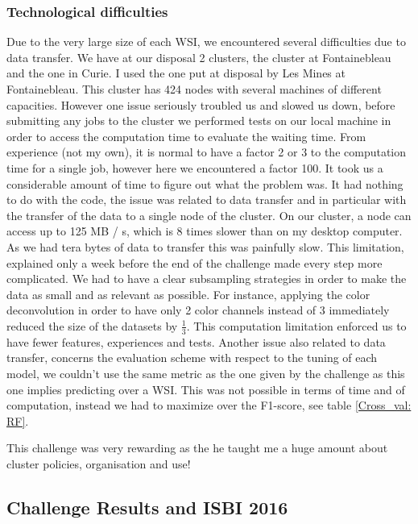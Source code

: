 \documentclass[a4paper,10pt]{article}
\begin{document}
\subsubsection*{Technological difficulties}

Due to the very large size of each WSI, we encountered several difficulties due to data transfer. We have at our disposal 2 clusters, the cluster at Fontainebleau and the one in Curie. I used the one put at disposal by Les Mines at Fontainebleau. This cluster has 424 nodes with several machines of different capacities. However one issue seriously troubled us and slowed us down, before submitting any jobs to the cluster we performed tests on our local machine in order to access the computation time to evaluate the waiting time. From experience (not my own), it is normal to have a factor 2 or 3 to the computation time for a single job, however here we encountered a factor 100. It took us a considerable amount of time to figure out what the problem was. It had nothing to do with the code, the issue was related to data transfer and in particular with the transfer of the data to a single node of the cluster. On our cluster, a node can access up to 125 MB / s, which is 8 times slower than on my desktop computer. As we had tera bytes of data to transfer this was painfully slow. This limitation, explained only a week before the end of the challenge made every step more complicated. We had to have a clear subsampling strategies in order to make the data as small and as relevant as possible. For instance, applying the color deconvolution in order to have only 2 color channels instead of 3 immediately reduced the size of the datasets by $\frac{1}{3}$. This computation limitation enforced us to have fewer features, experiences and tests. Another issue also related to data transfer, concerns the evaluation scheme with respect to the tuning of each model, we couldn't use the same metric as the one given by the challenge as this one implies predicting over a WSI. This was not possible in terms of time and of computation, instead we had to maximize over the F1-score, see table \ref{Cross_val: RF}.

This challenge was very rewarding as the he taught me a huge amount about cluster policies, organisation and use!


\subsection{Challenge Results and ISBI 2016}
\end{document}
